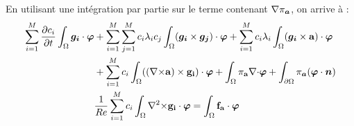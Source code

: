 En utilisant une intégration par partie sur le terme contenant ${\nabla}\pi_{\bm{a}}$, on arrive à :
\begin{align*}
\sum_{i=1}^M\frac{\partial c_i}{\partial t}\int_\Omega\bm{g_i}\cdot\bm{\varphi} &+ \sum_{i=1}^M\sum_{j=1}^Mc_i\lambda_ic_j\int_\Omega(\bm{g_i}\times \bm{g_j})\cdot\bm{\varphi} + \sum_{i=1}^Mc_i\lambda_i\int_\Omega(\bm{g_i}\times \mathbf{a})\cdot\bm{\varphi}\\
& +  \sum_{i=1}^Mc_i\int_\Omega(({\nabla\times}\mathbf{a})\times \mathbf{g_i})\cdot\bm{\varphi} + \int_\Omega\pi_{\mathbf{a}}{\nabla\cdot}\bm{\varphi} + \int_{\partial\Omega}\pi_{\bm{a}}(\bm{\varphi}\cdot\bm{n})\\
& \frac{1}{Re}\sum_{i=1}^Mc_i\int_\Omega{\nabla^2\times}\mathbf{g_i}\cdot\bm{\varphi} = \int_\Omega\mathbf{f_a}\cdot\bm{\varphi}\\
\end{align*}

